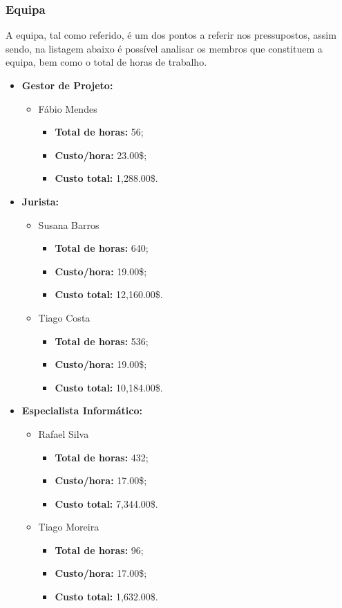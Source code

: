 
\subsubsection{Equipa}

A equipa, tal como referido, é um dos pontos a referir nos pressupostos, assim sendo, na listagem abaixo é possível analisar os membros que constituem a equipa, bem como o total de horas de trabalho.

\begin{itemize}
	\item \textbf{Gestor de Projeto:}
		\begin{itemize}
			\item Fábio Mendes
				\begin{itemize}
					\item \textbf{Total de horas:} 56;
					\item \textbf{Custo/hora:} 23.00\$;
					\item \textbf{Custo total:} 1,288.00\$.
				\end{itemize}
		\end{itemize}

	\item \textbf{Jurista:}
		\begin{itemize}
			\item Susana Barros
				\begin{itemize}
					\item \textbf{Total de horas:} 640;
					\item \textbf{Custo/hora:} 19.00\$;
					\item \textbf{Custo total:} 12,160.00\$.
				\end{itemize}
			\item Tiago Costa
				\begin{itemize}
					\item \textbf{Total de horas:} 536;
					\item \textbf{Custo/hora:} 19.00\$;
					\item \textbf{Custo total:} 10,184.00\$.
				\end{itemize}
		\end{itemize}

	\item \textbf{Especialista Informático:}
		\begin{itemize}
			\item Rafael Silva
				\begin{itemize}
					\item \textbf{Total de horas:} 432;
					\item \textbf{Custo/hora:} 17.00\$;
					\item \textbf{Custo total:} 7,344.00\$.
				\end{itemize}
			\item Tiago Moreira
				\begin{itemize}
					\item \textbf{Total de horas:} 96;
					\item \textbf{Custo/hora:} 17.00\$;
					\item \textbf{Custo total:} 1,632.00\$.
				\end{itemize}
		\end{itemize}


\end{itemize}
